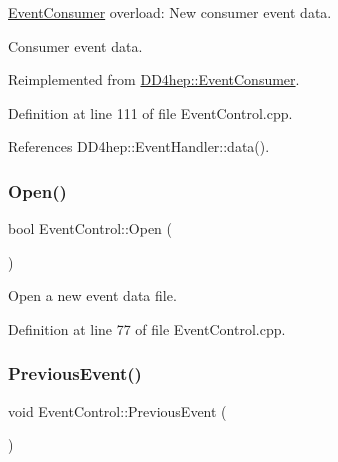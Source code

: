 \hyperlink{class_d_d4hep_1_1_event_consumer}{Event\+Consumer} overload\+: New consumer event data. 

Consumer event data. 

Reimplemented from \hyperlink{class_d_d4hep_1_1_event_consumer_a755b12d11f8676c4f2957f6a1f26fb31}{D\+D4hep\+::\+Event\+Consumer}.



Definition at line 111 of file Event\+Control.\+cpp.



References D\+D4hep\+::\+Event\+Handler\+::data().

\hypertarget{class_d_d4hep_1_1_event_control_ac317c6010a8ee404fb90da3081a05d8d}{}\label{class_d_d4hep_1_1_event_control_ac317c6010a8ee404fb90da3081a05d8d} 
\subsubsection{\texorpdfstring{Open()}{Open()}}
{\footnotesize\ttfamily bool Event\+Control\+::\+Open (\begin{DoxyParamCaption}{ }\end{DoxyParamCaption})\hspace{0.3cm}{\ttfamily [virtual]}}



Open a new event data file. 



Definition at line 77 of file Event\+Control.\+cpp.

\hypertarget{class_d_d4hep_1_1_event_control_aa313ad37f6a3a7b3d5a26abb37c051d3}{}\label{class_d_d4hep_1_1_event_control_aa313ad37f6a3a7b3d5a26abb37c051d3} 
\subsubsection{\texorpdfstring{Previous\+Event()}{PreviousEvent()}}
{\footnotesize\ttfamily void Event\+Control\+::\+Previous\+Event (\begin{DoxyParamCaption}{ }\end{DoxyParamCaption})\hspace{0.3cm}{\ttfamily [virtual]}}



